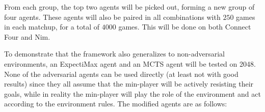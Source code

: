 From each group, the top two agents will be picked out, forming a new group of four agents. These agents will also be paired in all combinations with $250$ games in each matchup, for a total of $4000$ games. This will be done on both 
Connect Four and Nim.

To demonstrate that the framework also generalizes to non-adversarial environments, an ExpectiMax agent and an MCTS agent will be tested on 2048. None of the adversarial agents can be used directly (at least not with good results) since they all assume that the min-player will be actively resisting their goals, while in reality the min-player will play the role of the environment and act according to the environment rules. The modified agents are as follows:


